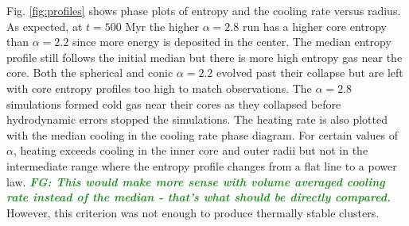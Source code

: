 \documentclass[iop,apjl, twocolappendix]{emulateapj}   %
\def\FG#1{{\textcolor{ForestGreen}{\textbf{\textit{ FG: #1}}}}}
\begin{document}
Fig. \ref{fig:profiles} shows phase plots of entropy and the cooling rate
versus radius. As expected, at $t= 500 \text{ Myr}$ the higher $\alpha=2.8$ run
has a higher core entropy than $\alpha=2.2$ since more energy is deposited in
the center. The median entropy profile still follows the initial median but
there is more high entropy gas near the core. Both the spherical and conic
$\alpha=2.2$ evolved past their collapse but are left with core entropy
profiles too high to match observations. The $\alpha=2.8$ simulations formed
cold gas near their cores as they collapsed before hydrodynamic errors stopped
the simulations.
The heating rate is also plotted with the median cooling in the cooling rate
phase diagram. For certain values of $\alpha$, heating exceeds cooling in the
inner core and outer radii but not in the intermediate range where the entropy
profile changes from a flat line to a power law. \FG{This would make more
sense with volume averaged cooling rate instead of the median - that's what
should be directly compared.} However, this criterion was not enough to produce
thermally stable clusters.
\end{document}
